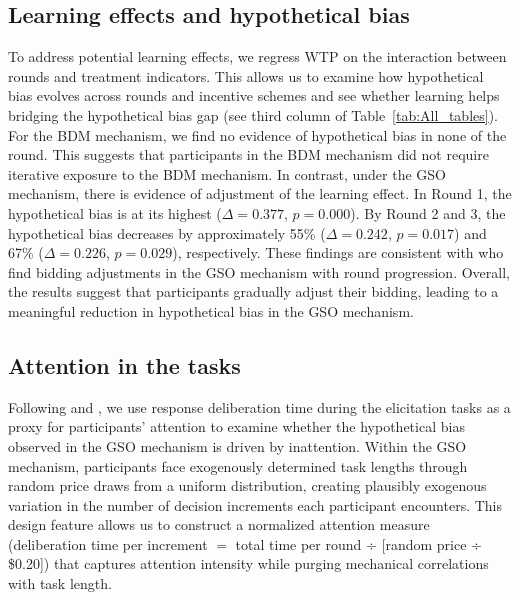 \documentclass[12pt]{article}
\begin{document}
\subsection{Learning effects and hypothetical bias}
\label{Sec: learning}
To address potential learning effects, we regress WTP on the interaction between rounds and treatment indicators. This allows us to examine how hypothetical bias evolves across rounds and incentive schemes and see whether learning helps bridging the hypothetical bias gap (see third column of Table~\ref{tab:All_tables}). For the BDM mechanism, we find no evidence of hypothetical bias in none of the round. This suggests that participants in the BDM mechanism did not require iterative exposure to the BDM mechanism. 
In contrast, under the GSO mechanism, there is evidence of adjustment of the learning effect. In Round 1, the hypothetical bias is at its highest (\(\Delta = 0.377\), \(p = 0.000\)). By Round 2 and 3, the hypothetical bias decreases by approximately 55\% (\(\Delta = 0.242\), \(p =0.017\)) and 67\% (\(\Delta = 0.226\), \(p =0.029\)), respectively. These findings are consistent with \citet{brown_is_2023} who find bidding adjustments in the GSO mechanism with round progression. 
Overall, the results suggest that participants gradually adjust their bidding, leading to a meaningful reduction in hypothetical bias in the GSO mechanism. 






\subsection{Attention in the tasks}
\label{Sec: Attention}

Following \citet{alos2021cognitive} and \citet{alaoui2016endogenous}, we use response deliberation time during the elicitation tasks as a proxy for participants’ attention to examine whether the hypothetical bias observed in the GSO mechanism is driven by inattention. 
Within the GSO mechanism, participants face exogenously determined task lengths through random price draws from a uniform distribution, creating plausibly exogenous variation in the number of decision increments each participant encounters. This design feature allows us to construct a normalized attention measure (deliberation time per increment $=$ total time per round ÷ [random price ÷ \$0.20]) that captures attention intensity while purging mechanical correlations with task length. 
\end{document}
